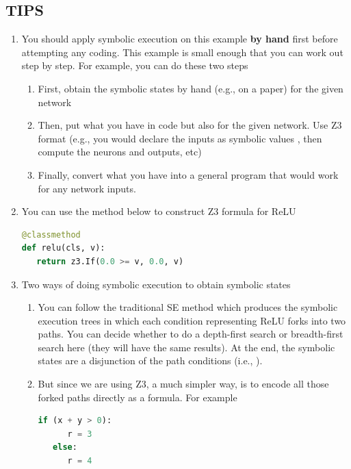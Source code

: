 \subsection{TIPS}

\begin{enumerate}[label=\arabic*.]
\item You should apply symbolic execution on this example \textbf{by hand} first before attempting any coding.  This example is small enough that you can work out step by step.  For example, you can do these two steps
    \begin{enumerate}[label=(\alph*)]
    \item First, obtain the symbolic states by hand (e.g., on a paper) for the given network
    \item Then, put what you have in code but also for the given network. Use Z3 format (e.g.,  you would declare the inputs as symbolic values , then compute the neurons and outputs, etc)
    \item Finally, convert what you have into a general program that would work for any network inputs.
    \end{enumerate}

\item You can use the method below to construct Z3 formula for ReLU

\begin{lstlisting}[language=Python]
@classmethod
def relu(cls, v):
   return z3.If(0.0 >= v, 0.0, v)
\end{lstlisting}

\item Two ways of doing symbolic execution to obtain symbolic states
    \begin{enumerate}[label=(\alph*)]
    \item You can follow the traditional SE method which produces the symbolic execution trees in which each condition representing ReLU forks into two paths.  You can decide whether to do a depth-first search or breadth-first search here (they will have the same results). At the end, the symbolic states are a disjunction of the path conditions (i.e., ).
    \item But since we are using Z3, a much simpler way, is to encode all those forked paths directly as a formula.  For example

\begin{lstlisting}[language=Python]
   if (x + y > 0):
      r = 3
   else:
      r = 4
\end{lstlisting}


\end{enumerate}
\end{enumerate}
